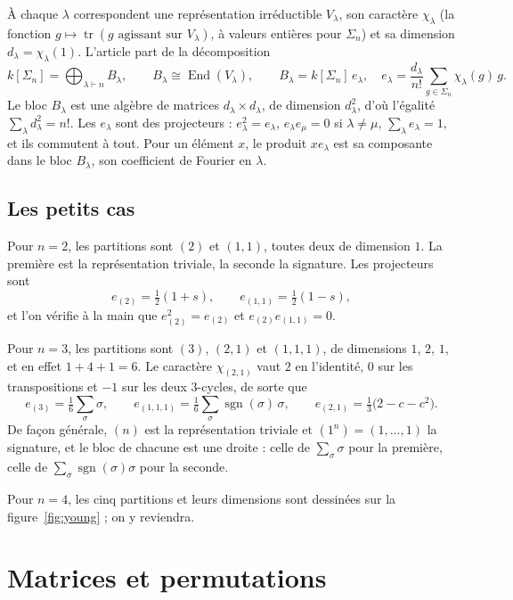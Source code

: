 \documentclass[11pt,a4paper]{amsart}
\theoremstyle{definition}
\theoremstyle{plain}
\theoremstyle{remark}
\newcommand{\End}{\operatorname{End}}
\newcommand{\sgn}{\operatorname{sgn}}
\newcommand{\tr}{\operatorname{tr}}
\begin{document}
À chaque $\lambda$ correspondent une représentation irréductible $V_\lambda$, son caractère $\chi_\lambda$ (la fonction $g \mapsto \tr(g \text{ agissant sur } V_\lambda)$, à valeurs entières pour $\Sigma_n$) et sa dimension $d_\lambda = \chi_\lambda(1)$. L'article part de la décomposition
\[
k[\Sigma_n] = \bigoplus_{\lambda \vdash n} B_\lambda, \qquad B_\lambda \cong \End(V_\lambda), \qquad B_\lambda = k[\Sigma_n]\, e_\lambda, \quad e_\lambda = \frac{d_\lambda}{n!} \sum_{g \in \Sigma_n} \chi_\lambda(g)\, g .
\]
Le bloc $B_\lambda$ est une algèbre de matrices $d_\lambda \times d_\lambda$, de dimension $d_\lambda^2$, d'où l'égalité $\sum_\lambda d_\lambda^2 = n!$. Les $e_\lambda$ sont des projecteurs : $e_\lambda^2 = e_\lambda$, $e_\lambda e_\mu = 0$ si $\lambda \ne \mu$, $\sum_\lambda e_\lambda = 1$, et ils commutent à tout. Pour un élément $x$, le produit $x e_\lambda$ est sa composante dans le bloc $B_\lambda$, son \og coefficient de Fourier\fg{} en $\lambda$.

\subsection{Les petits cas}

Pour $n = 2$, les partitions sont $(2)$ et $(1,1)$, toutes deux de dimension $1$. La première est la représentation triviale, la seconde la signature. Les projecteurs sont
\[
e_{(2)} = \tfrac12 (1 + s), \qquad e_{(1,1)} = \tfrac12 (1 - s),
\]
et l'on vérifie à la main que $e_{(2)}^2 = e_{(2)}$ et $e_{(2)} e_{(1,1)} = 0$.

Pour $n = 3$, les partitions sont $(3)$, $(2,1)$ et $(1,1,1)$, de dimensions $1$, $2$, $1$, et en effet $1 + 4 + 1 = 6$. Le caractère $\chi_{(2,1)}$ vaut $2$ en l'identité, $0$ sur les transpositions et $-1$ sur les deux $3$-cycles, de sorte que
\[
e_{(3)} = \tfrac16 \sum_\sigma \sigma, \qquad e_{(1,1,1)} = \tfrac16 \sum_\sigma \sgn(\sigma)\, \sigma, \qquad e_{(2,1)} = \tfrac13 \bigl(2 - c - c^2\bigr).
\]
De façon générale, $(n)$ est la représentation triviale et $(1^n) = (1, \dots, 1)$ la signature, et le bloc de chacune est une droite : celle de $\sum_\sigma \sigma$ pour la première, celle de $\sum_\sigma \sgn(\sigma)\sigma$ pour la seconde.

Pour $n = 4$, les cinq partitions et leurs dimensions sont dessinées sur la figure~\ref{fig:young} ; on y reviendra.

\section{Matrices et permutations}
\end{document}
